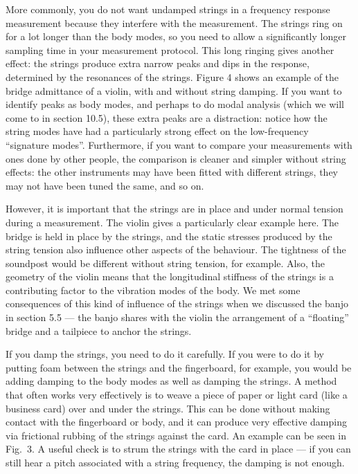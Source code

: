   More commonly, you do not want undamped strings in a frequency response 
  measurement because they interfere with the measurement. The strings ring on 
  for a lot longer than the body modes, so you need to allow a significantly 
  longer sampling time in your measurement protocol. This long ringing gives 
  another effect: the strings produce extra narrow peaks and dips in the 
  response, determined by the resonances of the strings. Figure 4 shows an 
  example of the bridge admittance of a violin, with and without string 
  damping. If you want to identify peaks as body modes, and perhaps to do modal 
  analysis (which we will come to in section 10.5), these extra peaks are a 
  distraction: notice how the string modes have had a particularly strong 
  effect on the low-frequency ``signature modes''. Furthermore, if you want to 
  compare your measurements with ones done by other people, the comparison is 
  cleaner and simpler without string effects: the other instruments may have 
  been fitted with different strings, they may not have been tuned the same, 
  and so on. 

  However, it is important that the strings are in place and under normal 
  tension during a measurement. The violin gives a particularly clear example 
  here. The bridge is held in place by the strings, and the static stresses 
  produced by the string tension also influence other aspects of the behaviour. 
  The tightness of the soundpost would be different without string tension, for 
  example. Also, the geometry of the violin means that the longitudinal 
  stiffness of the strings is a contributing factor to the vibration modes of 
  the body. We met some consequences of this kind of influence of the strings 
  when we discussed the banjo in section 5.5 — the banjo shares with the violin 
  the arrangement of a “floating” bridge and a tailpiece to anchor the strings. 

  If you damp the strings, you need to do it carefully. If you were to do it by 
  putting foam between the strings and the fingerboard, for example, you would 
  be adding damping to the body modes as well as damping the strings. A method 
  that often works very effectively is to weave a piece of paper or light card 
  (like a business card) over and under the strings. This can be done without 
  making contact with the fingerboard or body, and it can produce very 
  effective damping via frictional rubbing of the strings against the card. An 
  example can be seen in Fig.\ 3. A useful check is to strum the strings with 
  the card in place — if you can still hear a pitch associated with a string 
  frequency, the damping is not enough. 

